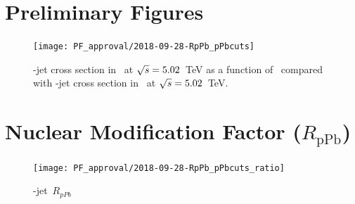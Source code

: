 \section{Preliminary Figures}


\begin{figure}[bth]
\begin{center}
\texttt{[image: PF\_approval/2018-09-28-RpPb\_pPbcuts]}
\caption{\Dzero-jet cross section in \pp\ at $\sqrt{s}=5.02$~TeV as a function of \ptchjet\ compared with \Dzero-jet cross section in \pPb\ at $\sqrt{s}=5.02$~TeV.} 
\label{fig:PromptD0JetPtSpectrum_pp_pPb}
\end{center}
\end{figure}



\section{Nuclear Modification Factor ($R_{\text{pPb}}$)}

\begin{figure}[bth]
\centering
\texttt{[image: PF\_approval/2018-09-28-RpPb\_pPbcuts\_ratio]}
\caption{\Dzero-jet\ $R_{pPb}$}
\label{fig:SysUnce_Dzero}
\end{figure}

